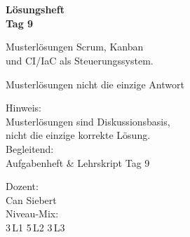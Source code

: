 \documentclass[11pt,a4paper,oneside]{article}
\begin{document}
\begin{titlepage}
  \pagestyle{empty}
  \vspace*{1.5cm}
  \\[2pt]
  \noindent{\color{lpAccent}\rule{\linewidth}{1.2pt}}\\[4pt]

  \vspace{3cm}
  {\sffamily\fontsize{30}{34}\selectfont\bfseries\color{lpInk}L\"osungsheft\\Tag 9\par}

  \vspace{0.7cm}
  {\sffamily\large\color{lpGray}Musterl\"osungen \textendash{} Scrum, Kanban\\und CI/IaC als Steuerungssystem.\par}

  \vspace{1.5cm}
  {\caveatfont\LARGE\color{lpGreen}Musterl\"osungen \textperiodcentered{} nicht die einzige Antwort}\par

  \vfill

  \noindent\begin{minipage}{0.55\linewidth}
    {\sffamily\footnotesize\color{lpGray}Hinweis:}\\
    {\sffamily\small\color{lpInk}Musterl\"osungen sind Diskussionsbasis,\\nicht die einzige korrekte L\"osung.}\\[10pt]
    {\sffamily\footnotesize\color{lpGray}Begleitend:}\\
    {\sffamily\small\color{lpInk}Aufgabenheft \& Lehrskript Tag 9}
  \end{minipage}\hfill
  \begin{minipage}{0.4\linewidth}
    \raggedleft
    {\sffamily\footnotesize\color{lpGray}Dozent:}\\
    {\sffamily\small\color{lpInk}Can Siebert}\\[10pt]
    {\sffamily\footnotesize\color{lpGray}Niveau-Mix:}\\
    {\sffamily\small\color{lpInk}3\,L1 \textperiodcentered{} 5\,L2 \textperiodcentered{} 3\,L3}
  \end{minipage}

  \vspace{0.5cm}
  \noindent{\color{lpAccent}\rule{\linewidth}{0.6pt}}
\end{titlepage}
\end{document}
